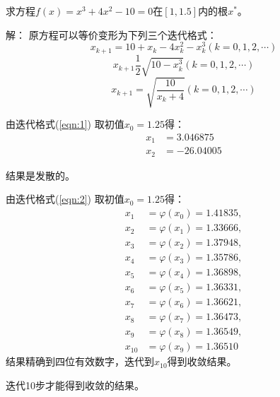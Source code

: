 \begin{example}
    求方程$f(x) = x^3+4x^2-10 = 0$在$[1,1.5]$内的根$x^*$。
    \begin{solution}
        解：
        原方程可以等价变形为下列三个迭代格式：
        \begin{equation}\label{eqn:1}
            x_{k+1} = 10+x_k-4x_k^2-x_k^3(k=0,1,2,\cdots )
        \end{equation}
        \begin{equation}\label{eqn:2}
            x_{k+1} \frac{1}{2}\sqrt{10-x_k^3}(k = 0,1,2,\cdots )
        \end{equation}
        \begin{equation}\label{eqn:3}
            x_{k+1} = \sqrt{\frac{10}{x_k+4}}(k = 0,1,2,\cdots )
        \end{equation}

        由迭代格式(\ref{eqn:1})
        取初值$x_0 = 1.25$得：
        \begin{align*}
            x_1 &= 3.046875\\
            x_2 &= -26.04005
        \end{align*}

        \begin{notice}
            结果是发散的。
        \end{notice}

        由迭代格式(\ref{eqn:2})
        取初值$x_0 = 1.25$得：
        \begin{align*}
            x_1 &= \varphi(x_0) = 1.41835,\\
            x_2 &= \varphi(x_1) = 1.33666,\\
            x_3 &= \varphi(x_2) = 1.37948,\\
            x_4 &= \varphi(x_3) = 1.35786,\\
            x_5 &= \varphi(x_4) = 1.36898,\\
            x_6 &= \varphi(x_5) = 1.36331,\\
            x_7 &= \varphi(x_6) = 1.36621,\\
            x_8 &= \varphi(x_7) = 1.36473,\\
            x_9 &= \varphi(x_8) = 1.36549,\\
            x_{10} &= \varphi(x_9) = 1.36510
        \end{align*}
        结果精确到四位有效数字，迭代到$x_{10}$得到收敛结果。
        \begin{notice}
            迭代10步才能得到收敛的结果。
        \end{notice}


\end{solution}
\end{example}
